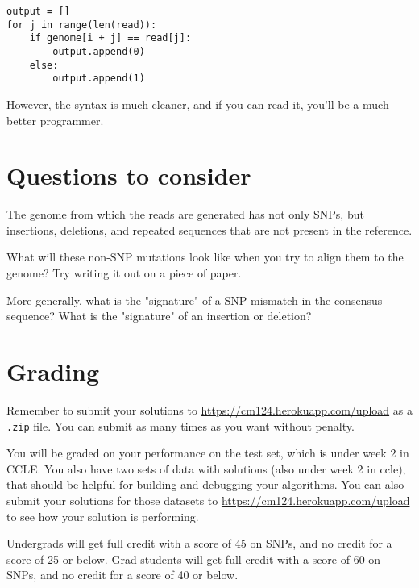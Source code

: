 \documentclass{article}
\begin{document}
\begin{verbatim}
output = []
for j in range(len(read)):
	if genome[i + j] == read[j]:
		output.append(0)
	else:
		output.append(1)
\end{verbatim}

However, the syntax is much cleaner, and if you can read it, you'll be a much better programmer.

\section*{Questions to consider}
The genome from which the reads are generated has not only SNPs, but insertions, deletions, and repeated sequences that are not present in the reference. 

What will these non-SNP mutations look like when you try to align them to the genome? Try writing it out on a piece of paper. 

More generally, what is the "signature" of a SNP mismatch in the consensus sequence?  What is the "signature" of an insertion or deletion?


\section*{Grading}

Remember to submit your solutions to \url{https://cm124.herokuapp.com/upload} as a \verb|.zip| file. You can submit as many times as you want without penalty.

You will be graded on your performance on the test set, which is under week 2 in CCLE. You also have two sets of data with solutions (also under week 2 in ccle), that should be helpful for building and debugging your algorithms. You can also submit your solutions for those datasets to \url{https://cm124.herokuapp.com/upload} to see how your solution is performing.

Undergrads will get full credit with a score of 45 on SNPs, and no credit for a score of 25 or below.  Grad students will get full credit with a score of 60 on SNPs, and no credit for a score of 40 or below.
\end{document}
